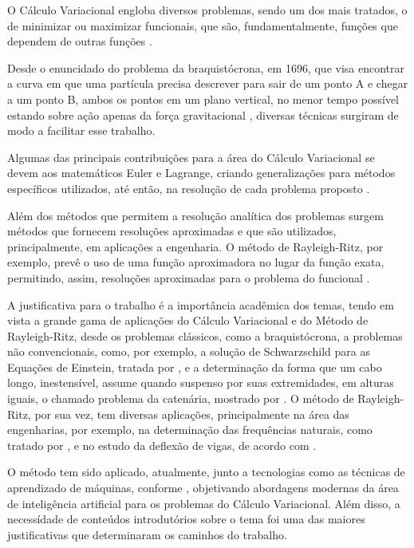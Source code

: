 \documentclass[
	12pt,				%
	openright,			%
    twoside,			%
	a4paper,			%
	english,			%
	french,				%
	spanish,			%
	brazil				%
	]{abntex2}
\numberwithin{lema}{chapter}
\numberwithin{teorema}{chapter}
\numberwithin{definicao}{chapter}
\numberwithin{exemplo}{chapter}
\numberwithin{figure}{chapter}
\begin{document}

O Cálculo Variacional engloba diversos problemas, sendo um dos mais tratados, o de minimizar ou maximizar funcionais, que são, fundamentalmente, funções que dependem de outras funções \cite{mefassan}.

Desde o enuncidado do problema da braquistócrona, em 1696, que visa encontrar a curva em que uma partícula precisa descrever para sair de um ponto A e chegar a um ponto B, ambos os pontos em um plano vertical, no menor tempo possível estando sobre ação apenas da força gravitacional \cite{calcvar}, diversas técnicas surgiram de modo a facilitar esse trabalho. 

Algumas das principais contribuições para a área do Cálculo Variacional se devem aos matemáticos Euler e Lagrange, criando generalizações para métodos específicos utilizados, até então, na resolução de cada problema proposto \cite{hist_courant}.

Além dos métodos que permitem a resolução analítica dos problemas surgem métodos que fornecem resoluções aproximadas e que são utilizados, principalmente, em aplicações a engenharia. O método de Rayleigh-Ritz, por exemplo, prevê o uso de uma função aproximadora no lugar da função exata, permitindo, assim, resoluções aproximadas para o problema do funcional \cite{mefassan}.

A justificativa para o trabalho é a importância acadêmica dos temas, tendo em vista a grande gama de aplicações do Cálculo Variacional e do Método de Rayleigh-Ritz, desde os problemas clássicos, como a braquistócrona, a problemas não convencionais, como, por exemplo, a solução de Schwarzschild para as Equações de Einstein, tratada por , e a determinação da forma que um cabo longo, inestensível, assume quando suspenso por suas extremidades, em alturas iguais, o chamado problema da catenária, mostrado por . O método de Rayleigh-Ritz, por sua vez, tem diversas aplicações, principalmente na área das engenharias, por exemplo, na determinação das frequências naturais, como tratado por , e no estudo da deflexão de vigas, de acordo com .

O método tem sido aplicado, atualmente, junto a tecnologias como as técnicas de aprendizado de máquinas, conforme , objetivando abordagens modernas da área de inteligência artificial para os problemas do Cálculo Variacional. Além disso, a necessídade de conteúdos introdutórios sobre o tema foi uma das maiores justificativas que determinaram os caminhos do trabalho.
\end{document}
